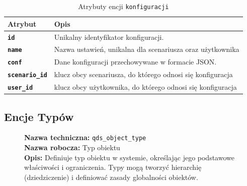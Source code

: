 \begin{table}[H]
    \centering
    \renewcommand{\arraystretch}{1.6}
    \begin{tabular}{|>{\bfseries}l|p{}|}
        \hline
        \rowcolor[HTML]{EFEFEF} \textbf{Atrybut} & \textbf{Opis} \\
        \hline
        \texttt{id} & Unikalny identyfikator konfiguracji. \\
        \hline
        \texttt{name} & Nazwa ustawień, unikalna dla scenariusza oraz użytkownika \\
        \hline
        \texttt{conf} & Dane konfiguracji przechowywane w formacie JSON. \\
        \hline
        \texttt{scenario\_id} & klucz obcy scenariusza, do którego odnosi się konfiguracja \\
        \hline
        \texttt{user\_id} & klucz obcy użytkownika, do którego odnosi się konfiguracja \\
        \hline
    \end{tabular}
    \caption{Atrybuty encji \texttt{konfiguracji}}
\end{table}

\subsection{Encje Typów}

\begin{figure}[H]
    \centering
    \begin{minipage}{0.8\textwidth}
        \begin{framed}
            \noindent\textbf{\large Nazwa techniczna:} \texttt{qds\_object\_type} \\
            \textbf{\large Nazwa robocza:} Typ obiektu \\
            \textbf{\large Opis:} Definiuje typ obiektu w systemie, określając jego podstawowe właściwości
            i ograniczenia. Typy mogą tworzyć hierarchię (dziedziczenie) i definiować zasady globalności obiektów.
        \end{framed}
    \end{minipage}
\end{figure}

